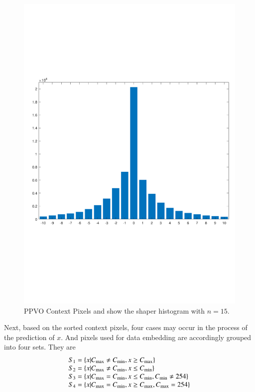 \documentclass[review,3p,10pt,sort&compress]{elsarticle}
\begin{document}
\begin{figure}
{\begin{minipage}[t]{0.42\linewidth}
    \includegraphics[width=1\textwidth]{figures/PPVO_Lena_CN15_hist_PN.pdf}
    \end{minipage}
}		
\centering
\caption{PPVO Context Pixels and show the shaper histogram with $n = 15$.}
\label{Fig.PPVOCNandHist}
\end{figure}
Next, based on the sorted context pixels, four cases may occur in the process of the prediction of $x$. And pixels used for data embedding are accordingly grouped into four sets. They are
\begin{equation}\label{eq:S}
\begin{array}{ll}
    S_1 = \{ x | C_{\rm max} \neq C_{\rm min}, x \geq C_{\rm max} \} \\
    S_2 = \{ x | C_{\rm max} \neq C_{\rm min}, x \leq C_{\rm min} \} \\
    S_3 = \{ x | C_{\rm max}   =  C_{\rm min}, x \leq C_{\rm min}, C_{\rm min} \neq 254 \} \\
    S_4 = \{ x | C_{\rm max}   =  C_{\rm min}, x \geq C_{\rm max}, C_{\rm max} =  254 \} \\
\end{array}
\end{equation}
\end{document}
